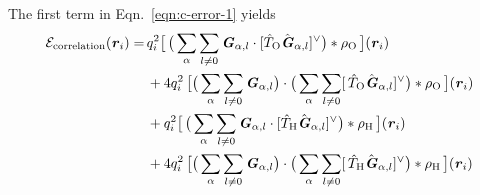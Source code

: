 \documentclass[aps,pre,preprint]{revtex4}
\renewcommand{\v}[1]{\textbf{\textit{#1}}}
\renewcommand{\d}[1]{\textsf{#1}}
\begin{document}
The first term in Eqn.~\eqref{eqn:c-error-1} yields
\begin{align}\nonumber
  \mathcal E_{\textrm{correlation}}(\v r_i)
  =\,&
  q_i^2
  \big[\,
  \big(
  \sum_{\alpha} \sum_{l\neq 0}
  \v G_{\alpha,l}\cdot[\hat T_{\textrm{O}}\hat{\v G}_{\alpha,l}]^{\vee}
  \big)
  \ast \rho_{\textrm{O}}
  \,\big] (\v r_i) \\\nonumber
  \,&+
  4q_i^2\,
  \big[
  \big(
  \sum_{\alpha} \sum_{l\neq 0}  
  \v G_{\alpha,l}
  \big)
  \cdot
  \big(
  \sum_{\alpha} \sum_{l\neq 0}  
  [\,\hat T_{\textrm{O}}\hat{\v G}_{\alpha,l}]^{\vee}
  \big)
  \ast \rho_{\textrm{O}}\,
  \big] (\v r_i) \\\nonumber
  \,&+
  q_i^2
  \big[\,
  \big(
  \sum_{\alpha} \sum_{l\neq 0}
  \v G_{\alpha,l}\cdot[\hat T_{\textrm{H}}\hat{\v G}_{\alpha,l}]^{\vee}
  \big)
  \ast \rho_{\textrm{H}}
  \,\big] (\v r_i) \\
  \,&+
  4q_i^2\,
  \big[
  \big(
  \sum_{\alpha} \sum_{l\neq 0}  
  \v G_{\alpha,l}
  \big)
  \cdot
  \big(
  \sum_{\alpha} \sum_{l\neq 0}  
  [\,\hat T_{\textrm{H}}\hat{\v G}_{\alpha,l}]^{\vee}
  \big)
  \ast \rho_{\textrm{H}}\,
  \big] (\v r_i) 
\end{align}
\end{document}
